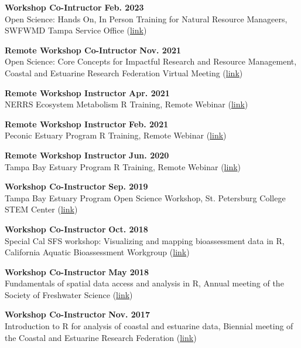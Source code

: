 \documentclass[letterpaper,12pt]{article}
\begin{document}
{\bf Workshop Co-Intructor} \hfill {\bf Feb. 2023}\\
Open Science: Hands On, In Person Training for Natural Resource Manageers, SWFWMD Tampa Service Office ({\footnotesize\href{https://tbep-tech.github.io/tbep-os-workshop/}{link}})

{\bf Remote Workshop Co-Intructor} \hfill {\bf Nov. 2021}\\
Open Science: Core Concepts for Impactful Research and Resource Management, Coastal and Estuarine Research Federation Virtual Meeting ({\footnotesize\href{https://tbep-tech.github.io/cerf-os-workshop/}{link}})

{\bf Remote Workshop Instructor} \hfill {\bf Apr. 2021}\\
NERRS Ecosystem Metabolism R Training, Remote Webinar ({\footnotesize\href{https://tbep-tech.github.io/ecometab-r-training/}{link}})

{\bf Remote Workshop Instructor} \hfill {\bf Feb. 2021}\\
Peconic Estuary Program R Training, Remote Webinar ({\footnotesize\href{https://tbep-tech.github.io/pep-r-training/}{link}})

{\bf Remote Workshop Instructor} \hfill {\bf Jun. 2020}\\
Tampa Bay Estuary Program R Training, Remote Webinar ({\footnotesize\href{https://tbep-tech.github.io/tbep-r-training/}{link}})

{\bf Workshop Co-Instructor} \hfill {\bf Sep. 2019}\\
Tampa Bay Estuary Program Open Science Workshop, St. Petersburg College STEM Center ({\footnotesize\href{https://tbep-tech.github.io/}{link}})

{\bf Workshop Co-Instructor} \hfill {\bf Oct. 2018}\\
Special Cal SFS workshop: Visualizing and mapping bioassessment data in R, California Aquatic Bioassessment Workgroup ({\footnotesize\href{https://sccwrp.github.io/CABW2018_R_training}{link}})

{\bf Workshop Co-Instructor} \hfill {\bf May 2018}\\
Fundamentals of spatial data access and analysis in R, Annual meeting of the Society of Freshwater Science ({\footnotesize\href{https://ryan-hill.github.io/sfs-r-gis-2018/}{link}})

{\bf Workshop Co-Instructor} \hfill {\bf Nov. 2017}\\
Introduction to R for analysis of coastal and estuarine data, Biennial meeting of the Coastal and Estuarine Research Federation ({\footnotesize\href{https://usepa.github.io/cerf_r/}{link}})
\end{document}
